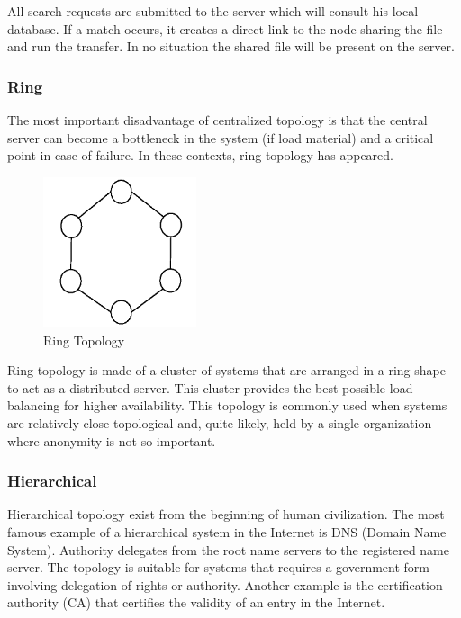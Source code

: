 All search requests are submitted to the server which will consult his local
database. If a match occurs, it creates a direct link to the node sharing the
file and run the transfer. In no situation the shared file will be present on
the server.

\subsubsection{Ring}

The most important disadvantage of centralized topology is that the central
server can become a bottleneck in the system (if load material) and a critical
point in case of failure. In these contexts, ring topology has appeared.

\begin{figure}
  \centering
  \includegraphics[width=0.4\textwidth]{src/img/p2p-systems/ring}
  \caption{Ring Topology}
  \label{fig:p2p-systems:ring}
\end{figure}

Ring topology is made of a cluster of systems that are arranged in a ring shape
to act as a distributed server. This cluster provides the best possible load
balancing for higher availability. This topology is commonly used when systems
are relatively close topological and, quite likely, held by a single
organization where anonymity is not so important.

\subsubsection{Hierarchical}

Hierarchical topology exist from the beginning of human civilization. The most
famous example of a hierarchical system in the Internet is DNS (Domain Name
System). Authority delegates from the root name servers to the registered name
server. The topology is suitable for systems that requires a government form
involving delegation of rights or authority. Another example is the certification
authority (CA) that certifies the validity of an entry in the Internet.

